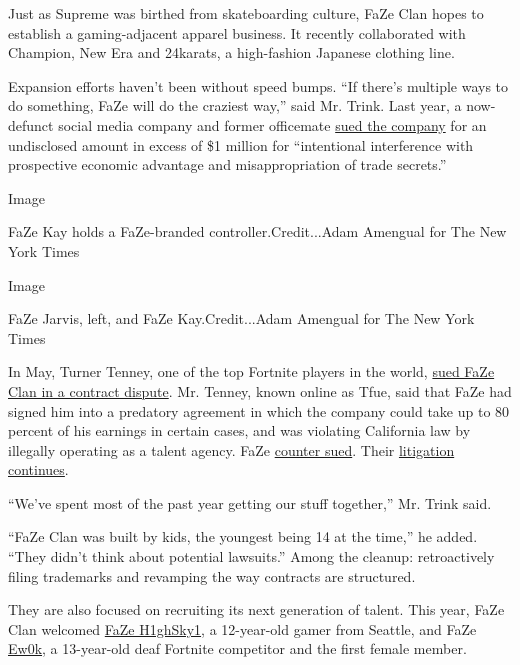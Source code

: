 Just as Supreme was birthed from skateboarding culture, FaZe Clan hopes
to establish a gaming-adjacent apparel business. It recently
collaborated with Champion, New Era and 24karats, a high-fashion
Japanese clothing line.

Expansion efforts haven't been without speed bumps. ``If there's
multiple ways to do something, FaZe will do the craziest way,'' said Mr.
Trink. Last year, a now-defunct social media company and former
officemate
\href{https://www.tubefilter.com/2019/06/05/faze-clan-lawsuit-hubrick-tfue/}{sued
the company} for an undisclosed amount in excess of \$1 million for
``intentional interference with prospective economic advantage and
misappropriation of trade secrets.''

Image

FaZe Kay holds a FaZe-branded controller.Credit...Adam Amengual for The
New York Times

Image

FaZe Jarvis, left, and FaZe Kay.Credit...Adam Amengual for The New York
Times

In May, Turner Tenney, one of the top Fortnite players in the world,
\href{https://www.theatlantic.com/technology/archive/2019/05/why-tfues-lawsuit-against-faze-clan-matters/589900/}{sued
FaZe Clan in a contract dispute}. Mr. Tenney, known online as Tfue, said
that FaZe had signed him into a predatory agreement in which the company
could take up to 80 percent of his earnings in certain cases, and was
violating California law by illegally operating as a talent agency. FaZe
\href{https://www.theverge.com/2019/8/1/20750678/faze-clan-tfue-lawsuit-20-million-streaming-earnings-rival-esports-team}{counter
sued}. Their
\href{https://www.polygon.com/2019/11/7/20953294/tfue-faze-clan-lawsuit-jury-trial-2020}{litigation
continues}.

``We've spent most of the past year getting our stuff together,'' Mr.
Trink said.

``FaZe Clan was built by kids, the youngest being 14 at the time,'' he
added. ``They didn't think about potential lawsuits.'' Among the
cleanup: retroactively filing trademarks and revamping the way contracts
are structured.

They are also focused on recruiting its next generation of talent. This
year, FaZe Clan welcomed
\href{http://nymag.com/intelligencer/2019/08/h1ghsky1-fortnite-world-cup.html}{FaZe
H1ghSky1}, a 12-year-old gamer from Seattle, and FaZe
\href{https://www.polygon.com/2019/7/28/8933873/faze-clan-ewok-joins-soleil-wheeler-first-female-fortnite-esports}{Ew0k},
a 13-year-old deaf Fortnite competitor and the first female member.


